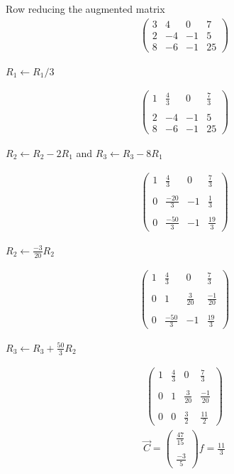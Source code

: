 \documentclass[journal,12pt,twocolumn]{IEEEtran}
\newcommand{\myvec}[1]{\ensuremath{\begin{pmatrix}#1\end{pmatrix}}}
\begin{document}
Row reducing the augmented matrix
\begin{align}
\myvec{3 & 4 & 0 & 7\\
2 & -4 & -1 & 5 \\
8 & -6 & -1 & 25}
\end{align}
\begin{center}
$R_1\leftarrow R_1/3$
\end{center}
\begin{align}
\myvec{1 & \frac{4}{3} & 0 & \frac{7}{3}\\ \\
2 & -4 & -1 & 5 \\ 
8 & -6 & -1 & 25}
\end{align}
\begin{center}
$R_2\leftarrow R_2 - 2R_1   $ and
$R_3\leftarrow R_3 - 8R_1$
\end{center}
\begin{align}
\myvec{1 & \frac{4}{3} & 0 & \frac{7}{3}\\ \\
0 & \frac{-20}{3} & -1 & \frac{1}{3} \\ \\
0 & \frac{-50}{3} & -1 & \frac{19}{3}}
\end{align}
\begin{center}
$R_2\leftarrow \frac{-3}{20}R_2   $
\end{center}
\begin{align}
\myvec{1 & \frac{4}{3} & 0 & \frac{7}{3}\\ \\
0 & 1 & \frac{3}{20} & \frac{-1}{20} \\ \\
0 & \frac{-50}{3} & -1 & \frac{19}{3}}
\end{align}
\begin{center}
$R_3\leftarrow R_3 + \frac{50}{3}R_2   $
\end{center}
\begin{align}
\myvec{1 & \frac{4}{3} & 0 & \frac{7}{3}\\ \\
0 & 1 & \frac{3}{20} & \frac{-1}{20} \\ \\
0 & 0 & \frac{3}{2} & \frac{11}{2}}
\end{align}
\begin{align}
\vec{C} = \myvec{\frac{47}{15}  \\ \\ \frac{-3}{5} }
f = \frac{11}{3}
\end{align}
\end{document}
